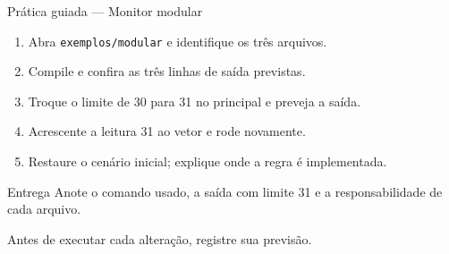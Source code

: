 \begin{frame}{Prática guiada — Monitor modular}
\begin{enumerate}
\item Abra \texttt{exemplos/modular} e identifique os três arquivos.
\item Compile e confira as três linhas de saída previstas.
\item Troque o limite de 30 para 31 no principal e preveja a saída.
\item Acrescente a leitura 31 ao vetor e rode novamente.
\item Restaure o cenário inicial; explique onde a regra é implementada.
\end{enumerate}
\begin{block}{Entrega}
Anote o comando usado, a saída com limite 31 e a responsabilidade de cada arquivo.
\end{block}
\small Antes de executar cada alteração, registre sua previsão.
\end{frame}
